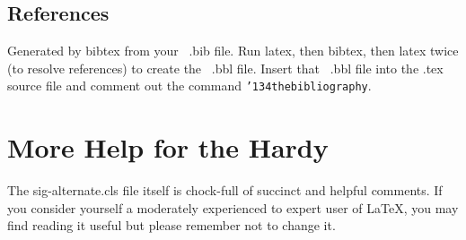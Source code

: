 \documentclass{nime-alternate}
\begin{document}
\subsection{References}
Generated by bibtex from your ~.bib file.  Run latex,
then bibtex, then latex twice (to resolve references)
to create the ~.bbl file.  Insert that ~.bbl file into
the .tex source file and comment out
the command \texttt{{\char'134}thebibliography}.

\section{More Help for the Hardy}
The sig-alternate.cls file itself is chock-full of succinct
and helpful comments.  If you consider yourself a moderately
experienced to expert user of \LaTeX, you may find reading
it useful but please remember not to change it.


\end{document}
